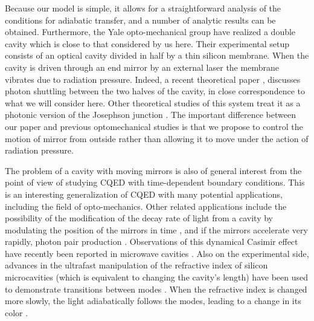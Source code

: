 \documentclass[twocolumn,english,pra,aps,superscriptaddress,floatfix]{revtex4-1}
\begin{document}
Because our model is simple, it allows for a straightforward analysis of the conditions for adiabatic transfer, and a number of analytic results can be obtained. Furthermore, the Yale opto-mechanical group have realized a double cavity \cite{thompson08,jayich08} which is close to that considered by us here. Their experimental setup consists of an optical cavity divided in half by a thin silicon membrane. When the cavity is driven through an end mirror by an external laser the membrane vibrates due to radiation pressure. Indeed, a recent theoretical paper  \cite{heinrich10}, discusses photon shuttling between the two halves of the cavity, in close correspondence to what we will consider here. Other theoretical studies of this system treat it as a photonic version of the Josephson junction \cite{chefles95,gerace09,larson10}. The important difference between our paper and previous optomechanical studies is that we propose to control the motion of mirror from outside rather than allowing it to move under the action of radiation pressure.


The problem of a cavity with moving mirrors is also of general interest from the point of view of studying CQED with time-dependent boundary conditions. This is an interesting generalization of CQED with many potential applications, including the field of opto-mechanics.  Other related applications include the possibility of the modification of the decay rate of light from a cavity by modulating the position of the mirrors in time \cite{liningtonthesis,linington06,linington09}, and if the mirrors accelerate very rapidly, photon pair production \cite{eberlein,lambrecht05,johansson09}. Observations of this dynamical Casimir effect have recently been reported in microwave cavities \cite{wilson10}.  Also on the experimental side, advances in the ultrafast manipulation of the refractive index of silicon microcavities (which is equivalent to changing the cavity's length) have been used to demonstrate transitions between modes \cite{dong08}. When the refractive index is changed more slowly, the light adiabatically follows the modes, leading to a change in its color \cite{preble07,reed03,yanik04,xu07}. 
\end{document}
